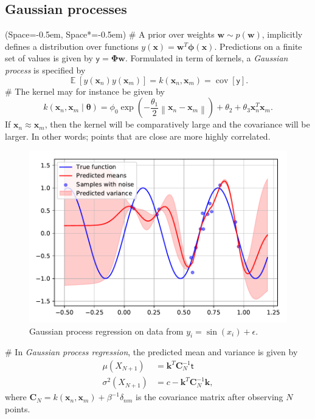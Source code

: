 \documentclass[12pt, a4paper]{article}
\newcommand{\listSpace}{-0.5em}%
\newcommand{\vect}[1]{\bm{#1}}
\newcommand{\norm}[1]{\left\lVert#1\right\rVert}
\DeclareMathOperator{\E}{\mathbb{E}}
\DeclareMathOperator{\cov}{\operatorname{cov}}
\begin{document}
\subsection*{Gaussian processes}
\begin{easylist}[itemize]
	\ListProperties(Space=\listSpace, Space*=\listSpace)
	# A prior over weights $\vect{w} \sim p(\vect{w})$, implicitly defines a distribution over functions $y(\vect{x}) = \vect{w}^T \vect{\phi}(\vect{x})$.
	Predictions on a finite set of values is given by $\mathsf{y} = \vect{\Phi} \vect{w}$.
	Formulated in term of kernels, a \emph{Gaussian process} is specified by
	\begin{equation*}
		\E \left[ y(\vect{x}_n) y(\vect{x}_m) \right]
		=
		k(\vect{x}_n, \vect{x}_m)
		= \cov \left[ \mathsf{y} \right].
	\end{equation*}
	# The kernel may for instance be given by
	\begin{equation*}
		k(\vect{x}_n, \vect{x}_m \mid \vect{\theta})
		=
		\phi_0 \exp \left( - \frac{\theta_1}{2}
		\norm{\vect{x}_n - \vect{x}_m} \right)
		+
		\theta_2
		+\theta_3 \vect{x}_n^T \vect{x}_m.
	\end{equation*}
	If $\vect{x}_n \approx \vect{x}_m$, then the kernel will be comparatively large and the covariance will be larger.
	In other words; points that are close are more highly correlated.
	
	\begin{figure}[ht!]
		\centering
		\includegraphics[width=0.7\linewidth]{figs/gaussian_process_regression}
		\caption{Gaussian process regression on data from $y_i = \sin(x_i) + \epsilon$.}
		\label{fig:gaussian_process_regression}
	\end{figure}
	
	
	# In \emph{Gaussian process regression}, the predicted mean and variance is given by
	\begin{align*}
		\mu (X_{N+1}) &= \vect{k}^T \vect{C}_N^{-1} \mathsf{t} \\
		\sigma^2 (X_{N+1}) &= c - \vect{k}^T \vect{C}_N^{-1} \vect{k},
	\end{align*}
	where $\vect{C}_N = k(\vect{x}_n, \vect{x}_m) + \beta^{-1} \delta_{nm}$ is the covariance matrix after observing $N$ points.
\end{easylist}
\end{document}
